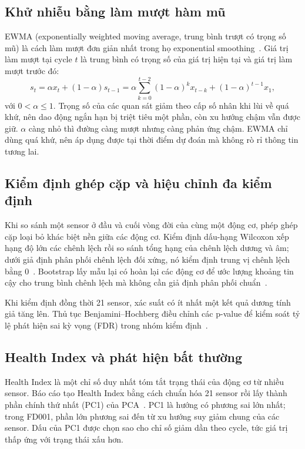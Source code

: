 \subsection{Khử nhiễu bằng làm mượt hàm mũ}
EWMA (exponentially weighted moving average, trung bình trượt có trọng số mũ) là
cách làm mượt đơn giản nhất trong họ exponential smoothing~\cite{hyndman2021fpp3}.
Giá trị làm mượt tại cycle $t$ là trung bình có trọng số của giá trị hiện tại và
giá trị làm mượt trước đó:
\begin{equation}
 s_t=\alpha x_t+(1-\alpha)s_{t-1}
    =\alpha\sum_{k=0}^{t-2}(1-\alpha)^k x_{t-k}+(1-\alpha)^{t-1}x_1,
 \label{eq:ewma-theory}
\end{equation}
với $0<\alpha\leq1$. Trọng số của các quan sát giảm theo cấp số nhân khi lùi về quá
khứ, nên dao động ngắn hạn bị triệt tiêu một phần, còn xu hướng chậm vẫn được giữ.
$\alpha$ càng nhỏ thì đường càng mượt nhưng càng phản ứng chậm. EWMA chỉ dùng quá
khứ, nên áp dụng được tại thời điểm dự đoán mà không rò rỉ thông tin tương lai.

\subsection{Kiểm định ghép cặp và hiệu chỉnh đa kiểm định}
Khi so sánh một sensor ở đầu và cuối vòng đời của cùng một động cơ, phép ghép
cặp loại bỏ khác biệt nền giữa các động cơ. Kiểm định dấu-hạng Wilcoxon xếp hạng
độ lớn các chênh lệch rồi so sánh tổng hạng của chênh lệch dương và âm; dưới giả
định phân phối chênh lệch đối xứng, nó kiểm định trung vị chênh lệch bằng
0~\cite{wilcoxon1945,scipyWilcoxon}. Bootstrap lấy mẫu lại có hoàn lại các động
cơ để ước lượng khoảng tin cậy cho trung bình chênh lệch mà không cần giả định
phân phối chuẩn~\cite{efron1979bootstrap,scipyBootstrap}.

Khi kiểm định đồng thời 21 sensor, xác suất có ít nhất một kết quả dương tính giả
tăng lên. Thủ tục Benjamini--Hochberg điều chỉnh các p-value để kiểm soát tỷ lệ
phát hiện sai kỳ vọng (FDR) trong nhóm kiểm định~\cite{benjamini1995fdr,scipyFDR}.

\subsection{Health Index và phát hiện bất thường}
Health Index là một chỉ số duy nhất tóm tắt trạng thái của động cơ từ nhiều
sensor. Báo cáo tạo Health Index bằng cách chuẩn hóa 21 sensor rồi lấy thành
phần chính thứ nhất (PC1) của PCA~\cite{sklearnPCA}. PC1 là hướng có phương sai
lớn nhất; trong FD001, phần lớn phương sai đến từ xu hướng suy giảm chung của các
sensor. Dấu của PC1 được chọn sao cho chỉ số giảm dần theo cycle, tức giá trị thấp
ứng với trạng thái xấu hơn.

